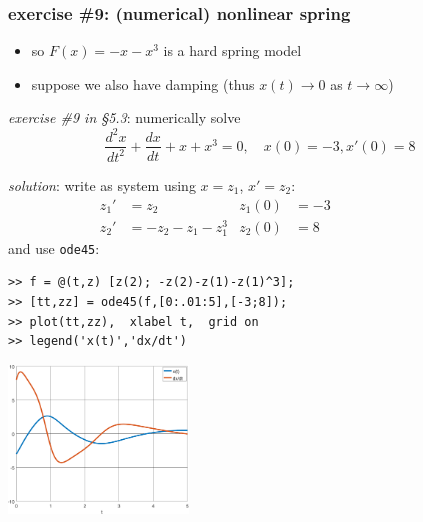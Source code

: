 \documentclass[dvipsnames,colorlinks]{beamer}
\begin{document}
\begin{frame}[fragile]
\frametitle{exercise \#9: (numerical) nonlinear spring}

\begin{itemize}
\item so $F(x)=-x-x^3$ is a hard spring model
\item suppose we also have damping (thus $x(t)\to 0$ as $t\to \infty$)
\end{itemize}

\noindent \emph{exercise \#9 in \S5.3}:  numerically solve
    $$\frac{d^2 x}{dt^2} + \frac{dx}{dt} + x + x^3 = 0, \quad x(0)=-3, x'(0)=8$$

\noindent \emph{solution}:  write as system using $x=z_1$, $x'=z_2$:
\begin{align*}
z_1' &= z_2  & z_1(0)&=-3  &&&&&&&&\\
z_2' &= -z_2 - z_1 - z_1^3 & z_2(0)&=8 &&&&&&&&
\end{align*}
and use \texttt{ode45}:
\begin{Verbatim}[fontsize=\footnotesize]
>> f = @(t,z) [z(2); -z(2)-z(1)-z(1)^3];
>> [tt,zz] = ode45(f,[0:.01:5],[-3;8]);
>> plot(tt,zz),  xlabel t,  grid on
>> legend('x(t)','dx/dt')
\end{Verbatim}

\vspace{-25mm}

\hfill \includegraphics[width=0.36\textwidth]{figs/hardspringsoln}
\end{frame}
\end{document}
